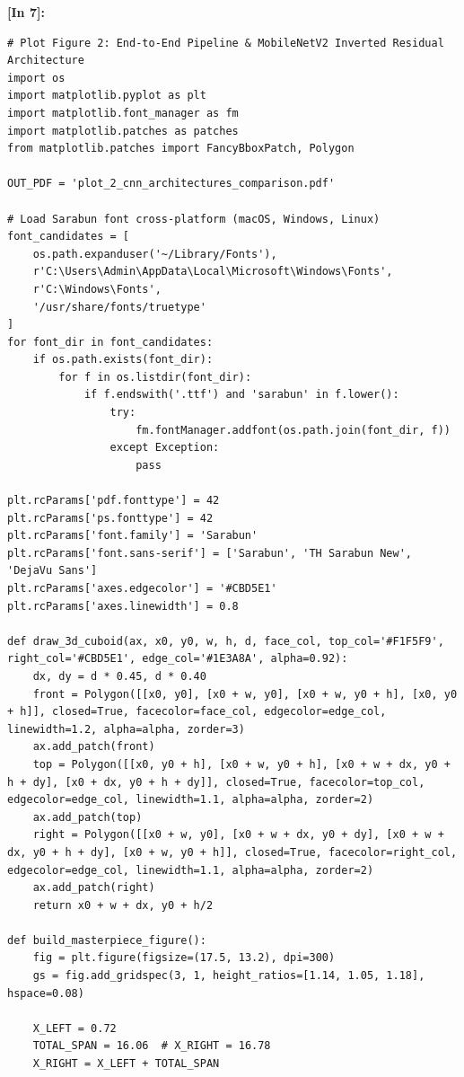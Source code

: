 \vspace{0.6em}
\noindent\textbf{\small [In 7]:}
\begin{lstlisting}[style=pycode]
# Plot Figure 2: End-to-End Pipeline & MobileNetV2 Inverted Residual Architecture
import os
import matplotlib.pyplot as plt
import matplotlib.font_manager as fm
import matplotlib.patches as patches
from matplotlib.patches import FancyBboxPatch, Polygon

OUT_PDF = 'plot_2_cnn_architectures_comparison.pdf'

# Load Sarabun font cross-platform (macOS, Windows, Linux)
font_candidates = [
    os.path.expanduser('~/Library/Fonts'),
    r'C:\Users\Admin\AppData\Local\Microsoft\Windows\Fonts',
    r'C:\Windows\Fonts',
    '/usr/share/fonts/truetype'
]
for font_dir in font_candidates:
    if os.path.exists(font_dir):
        for f in os.listdir(font_dir):
            if f.endswith('.ttf') and 'sarabun' in f.lower():
                try:
                    fm.fontManager.addfont(os.path.join(font_dir, f))
                except Exception:
                    pass

plt.rcParams['pdf.fonttype'] = 42
plt.rcParams['ps.fonttype'] = 42
plt.rcParams['font.family'] = 'Sarabun'
plt.rcParams['font.sans-serif'] = ['Sarabun', 'TH Sarabun New', 'DejaVu Sans']
plt.rcParams['axes.edgecolor'] = '#CBD5E1'
plt.rcParams['axes.linewidth'] = 0.8

def draw_3d_cuboid(ax, x0, y0, w, h, d, face_col, top_col='#F1F5F9', right_col='#CBD5E1', edge_col='#1E3A8A', alpha=0.92):
    dx, dy = d * 0.45, d * 0.40
    front = Polygon([[x0, y0], [x0 + w, y0], [x0 + w, y0 + h], [x0, y0 + h]], closed=True, facecolor=face_col, edgecolor=edge_col, linewidth=1.2, alpha=alpha, zorder=3)
    ax.add_patch(front)
    top = Polygon([[x0, y0 + h], [x0 + w, y0 + h], [x0 + w + dx, y0 + h + dy], [x0 + dx, y0 + h + dy]], closed=True, facecolor=top_col, edgecolor=edge_col, linewidth=1.1, alpha=alpha, zorder=2)
    ax.add_patch(top)
    right = Polygon([[x0 + w, y0], [x0 + w + dx, y0 + dy], [x0 + w + dx, y0 + h + dy], [x0 + w, y0 + h]], closed=True, facecolor=right_col, edgecolor=edge_col, linewidth=1.1, alpha=alpha, zorder=2)
    ax.add_patch(right)
    return x0 + w + dx, y0 + h/2

def build_masterpiece_figure():
    fig = plt.figure(figsize=(17.5, 13.2), dpi=300)
    gs = fig.add_gridspec(3, 1, height_ratios=[1.14, 1.05, 1.18], hspace=0.08)

    X_LEFT = 0.72
    TOTAL_SPAN = 16.06  # X_RIGHT = 16.78
    X_RIGHT = X_LEFT + TOTAL_SPAN


\end{lstlisting}
